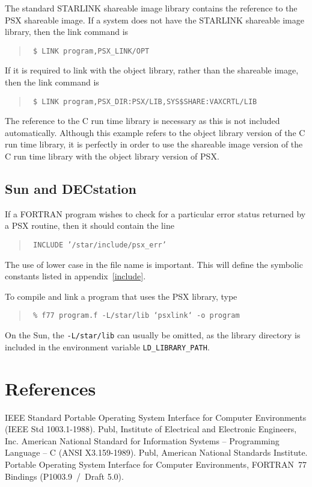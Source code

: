 The standard STARLINK shareable image library contains the reference to the PSX
shareable image. If a system does not have the STARLINK shareable image
library, then the link command is

\begin{quote}{\tt
\$ LINK program,PSX\_LINK/OPT
}
\end{quote}

If it is required to link with the object library, rather than the shareable
image, then the link command is

\begin{quote}{\tt
\$ LINK program,PSX\_DIR:PSX/LIB,SYS\$SHARE:VAXCRTL/LIB
}
\end{quote}

The reference to the C run time library is necessary as this is not included
automatically. Although this example refers to the object library version of
the C run time library, it is perfectly in order to use the shareable image
version of the C run time library with the object library version of PSX.

\subsection{Sun and DECstation}

If a FORTRAN program wishes to check for a particular error status returned by
a PSX routine, then it should contain the line

\begin{quote}{\tt
INCLUDE '/star/include/psx\_err'
}
\end{quote}

The use of lower case in the file name is important. This will define the
symbolic constants listed in appendix~\ref{include}.

To compile and link a program that uses the PSX library, type

\begin{quote}{\tt
\% f77 program.f -L/star/lib `psxlink` -o program
}
\end{quote}

On the Sun, the {\tt -L/star/lib} can usually be omitted, as the library
directory is included in the environment variable {\tt LD\_LIBRARY\_PATH}.

\section{References}
\markright{\stardocname}  %
\begin{thebibliography}{9}
IEEE Standard Portable Operating System Interface for Computer
Environments (IEEE Std 1003.1-1988). Publ, Institute of Electrical and
Electronic Engineers, Inc.
American National Standard for Information Systems --
Programming Language -- C (ANSI X3.159-1989). Publ, American National Standards
Institute.
Portable Operating System Interface for Computer
Environments, FORTRAN~77 Bindings (P1003.9~/~Draft 5.0).
\end{thebibliography}

